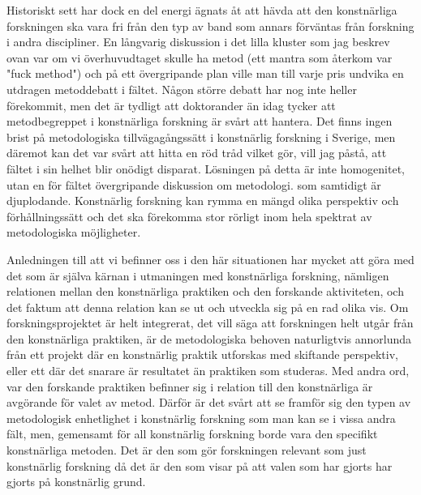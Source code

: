 \documentclass[11pt]{article}
\begin{document}
Historiskt sett har dock en del energi ägnats åt att hävda att den
konstnärliga forskningen ska vara fri från den typ av band som annars
förväntas från forskning i andra discipliner. En långvarig diskussion i
det lilla kluster som jag beskrev ovan var om vi överhuvudtaget skulle
ha metod (ett mantra som återkom var "fuck method") och på ett
övergripande plan ville man till varje pris undvika en utdragen
metoddebatt i fältet. Någon större debatt har nog inte heller
förekommit, men det är tydligt att doktorander än idag tycker att
metodbegreppet i konstnärliga forskning är svårt att hantera. Det finns
ingen brist på metodologiska tillvägagångssätt i konstnärlig forskning i
Sverige, men däremot kan det var svårt att hitta en röd tråd vilket gör,
vill jag påstå, att fältet i sin helhet blir onödigt disparat. Lösningen
på detta är inte homogenitet, utan en för fältet övergripande diskussion
om metodologi. som samtidigt är djuplodande. Konstnärlig forskning kan
rymma en mängd olika perspektiv och förhållningssätt och det ska
förekomma stor rörligt inom hela spektrat av metodologiska möjligheter.

Anledningen till att vi befinner oss i den här situationen har mycket
att göra med det som är själva kärnan i utmaningen med konstnärliga
forskning, nämligen relationen mellan den konstnärliga praktiken och den
forskande aktiviteten, och det faktum att denna relation kan se ut och
utveckla sig på en rad olika vis. Om forskningsprojektet är helt
integrerat, det vill säga att forskningen helt utgår från den
konstnärliga praktiken, är de metodologiska behoven naturligtvis
annorlunda från ett projekt där en konstnärlig praktik utforskas med
skiftande perspektiv, eller ett där det snarare är resultatet än
praktiken som studeras. Med andra ord, var den forskande praktiken
befinner sig i relation till den konstnärliga är avgörande för valet av
metod. Därför är det svårt att se framför sig den typen av metodologisk
enhetlighet i konstnärlig forskning som man kan se i vissa andra fält,
men, gemensamt för all konstnärlig forskning borde vara den specifikt
konstnärliga metoden. Det är den som gör forskningen relevant som just
konstnärlig forskning då det är den som visar på att valen som har
gjorts har gjorts på konstnärlig grund.
\end{document}
